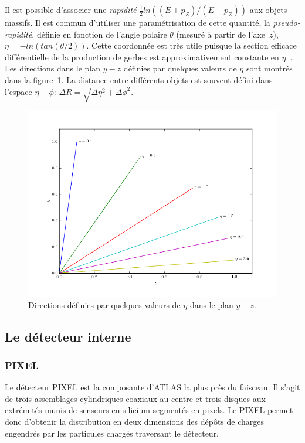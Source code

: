 Il est possible d'associer une \emph{rapidité}
$\frac{1}{2}ln((E + p_Z)/(E - p_Z))$ aux objets massifs. Il est
commun d'utiliser une paramétrisation de cette quantité, la
\emph{pseudo-rapidité}, définie en fonction de l'angle polaire
$\theta$ (mesuré à partir de l'axe~$z$), $\eta =
-ln(tan(\theta/2))$. Cette coordonnée est très utile puisque la
section efficace différentielle de la production de gerbes est
approximativement constante en $\eta$~\cite{thomson_modern_2013}. Les
directions dans le plan $y-z$ définies par quelques valeurs de $\eta$
sont montrés dans la figure~\ref{fig:eta}. La distance entre
différents objets est souvent défini dans l'espace $\eta-\phi$:
$\Delta R = \sqrt{\Delta\eta^2 + \Delta\phi^2}$.
\begin{figure}[h]
  \centering
  \includegraphics[width=.5\textwidth]{eta.png}
  \caption{Directions définies par quelques valeurs de $\eta$ dans le plan $y-z$.}
  \label{fig:eta}
\end{figure}

\subsection{Le détecteur interne}
\label{sec:lhc_atlas:atlas:indet}


\subsubsection{PIXEL}

Le détecteur PIXEL est la composante d'ATLAS la plus près du
faisceau. Il s'agit de trois assemblages cylindriques coaxiaux au
centre et trois disques aux extrémités munis de senseurs en silicium
segmentés en pixels. Le PIXEL permet donc d'obtenir la distribution en
deux dimensions des dépôts de charges engendrés par les particules
chargés traversant le détecteur.

